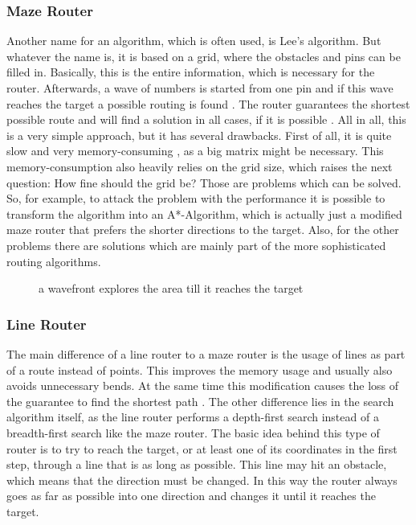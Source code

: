 \subsubsection{Maze Router}
Another name for an algorithm, which is often used, is Lee's algorithm. But whatever the name is, it is based on a grid, where the obstacles and pins can be filled in. Basically, this is the entire information, which is necessary for the router. Afterwards, a wave of numbers is started from one pin and if this wave reaches the target a possible routing is found . The router guarantees the shortest possible route and will find a solution in all cases, if it is possible \cite[p. 693]{kaufmann:electronic_design_automation}. All in all, this is a very simple approach, but it has several drawbacks. First of all, it is quite slow and very memory-consuming \cite[p. 693]{kaufmann:electronic_design_automation}, as a big matrix might be necessary. This memory-consumption also heavily relies on the grid size, which raises the next question: How fine should the grid be? Those are problems which can be solved. So, for example, to attack the problem with the performance it is possible to transform the algorithm into an A*-Algorithm, which is actually just a modified maze router that prefers the shorter directions to the target. Also, for the other problems there are solutions which are mainly part of the more sophisticated routing algorithms.

\begin{figure}
	\centering
	
	\caption{a wavefront explores the area till it reaches the target}
	\label{fig:maze_router}
\end{figure}

\subsubsection{Line Router}
The main difference of a line router to a maze router is the usage of lines as part of a route instead of points. This improves the memory usage and usually also avoids unnecessary bends. At the same time this modification causes the loss of the guarantee to find the shortest path \cite[p. 695]{kaufmann:electronic_design_automation}. The other difference lies in the search algorithm itself, as the line router performs a depth-first search instead of a breadth-first search like the maze router. The basic idea behind this type of router is to try to reach the target, or at least one of its coordinates in the first step, through a line that is as long as possible. This line may hit an obstacle, which means that the direction must be changed. In this way the router always goes as far as possible into one direction and changes it until it reaches the target.

